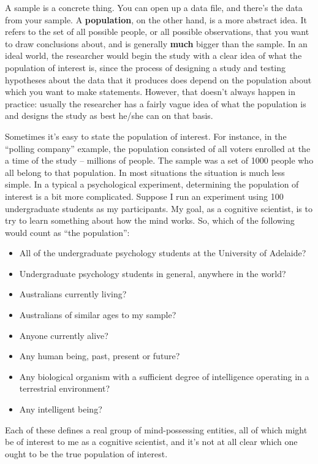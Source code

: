 \documentclass[]{book}
\begin{document}
A sample is a concrete thing. You can open up a data file, and there's the data from your sample. A \textbf{population}, on the other hand, is a more abstract idea. It refers to the set of all possible people, or all possible observations, that you want to draw conclusions about, and is generally \textbf{much} bigger than the sample. In an ideal world, the researcher would begin the study with a clear idea of what the population of interest is, since the process of designing a study and testing hypotheses about the data that it produces does depend on the population about which you want to make statements. However, that doesn't always happen in practice: usually the researcher has a fairly vague idea of what the population is and designs the study as best he/she can on that basis.

Sometimes it's easy to state the population of interest. For instance, in the ``polling company'' example, the population consisted of all voters enrolled at the a time of the study -- millions of people. The sample was a set of 1000 people who all belong to that population. In most situations the situation is much less simple. In a typical a psychological experiment, determining the population of interest is a bit more complicated. Suppose I run an experiment using 100 undergraduate students as my participants. My goal, as a cognitive scientist, is to try to learn something about how the mind works. So, which of the following would count as ``the population'':

\begin{itemize}
\item
  All of the undergraduate psychology students at the University of Adelaide?
\item
  Undergraduate psychology students in general, anywhere in the world?
\item
  Australians currently living?
\item
  Australians of similar ages to my sample?
\item
  Anyone currently alive?
\item
  Any human being, past, present or future?
\item
  Any biological organism with a sufficient degree of intelligence operating in a terrestrial environment?
\item
  Any intelligent being?
\end{itemize}

Each of these defines a real group of mind-possessing entities, all of which might be of interest to me as a cognitive scientist, and it's not at all clear which one ought to be the true population of interest.
\end{document}
